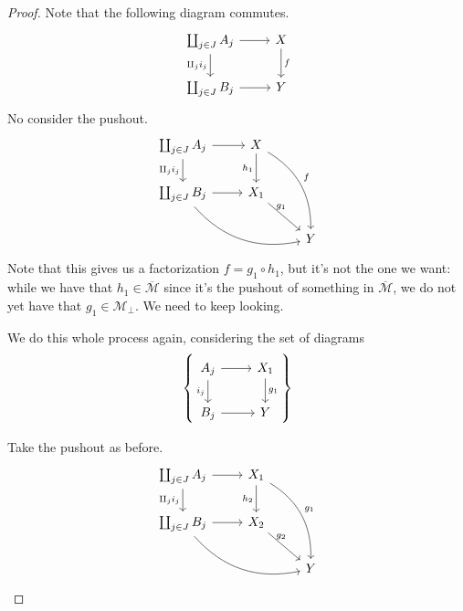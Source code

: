\documentclass[main.tex]{subfiles}
\begin{document}
\begin{proof}
  Note that the following diagram commutes.
  \begin{equation*}
    \begin{tikzcd}
      \coprod_{j \in J} A_{j}
      \arrow[r]
      \arrow[d, swap, "\amalg_{j} i_{j}"]
      & X
      \arrow[d, "f"]
      \\
      \coprod_{j \in J} B_{j}
      \arrow[r]
      & Y
    \end{tikzcd}
  \end{equation*}
  No consider the pushout.
  \begin{equation*}
    \begin{tikzcd}
      \coprod_{j \in J} A_{j}
      \arrow[r]
      \arrow[d, swap, "\amalg_{j} i_{j}"]
      & X
      \arrow[ddr, bend left, "f"]
      \arrow[d, swap, "h_{1}"]
      \\
      \coprod_{j \in J} B_{j}
      \arrow[r]
      \arrow[rrd, bend right]
      & X_{1}
      \arrow[rd, outer sep=-2pt, near start, "g_{1}"]
      \\
      & & Y
    \end{tikzcd}
  \end{equation*}
  Note that this gives us a factorization $f = g_{1} \circ h_{1}$, but it's not the one we want: while we have that $h_{1} \in \overline{\mathcal{M}}$ since it's the pushout of something in $\overline{\mathcal{M}}$, we do not yet have that $g_{1} \in \mathcal{M}_{\perp}$. We need to keep looking.

  We do this whole process again, considering the set of diagrams
  \begin{equation*}
    \left\{
      \begin{tikzcd}
        A_{j}
        \arrow[r]
        \arrow[d, swap, "i_{j}"]
        & X_{1}
        \arrow[d, "g_{1}"]
        \\
        B_{j}
        \arrow[r]
        & Y
      \end{tikzcd}
    \right\}
  \end{equation*}

  Take the pushout as before.
  \begin{equation*}
    \begin{tikzcd}
      \coprod_{j \in J} A_{j}
      \arrow[r]
      \arrow[d, swap, "\amalg_{j} i_{j}"]
      & X_{1}
      \arrow[ddr, bend left, "g_{1}"]
      \arrow[d, swap, "h_{2}"]
      \\
      \coprod_{j \in J} B_{j}
      \arrow[r]
      \arrow[rrd, bend right]
      & X_{2}
      \arrow[rd, outer sep=-2pt, near start, "g_{2}"]
      \\
      & & Y
    \end{tikzcd}
  \end{equation*}


\end{proof}
\end{document}
